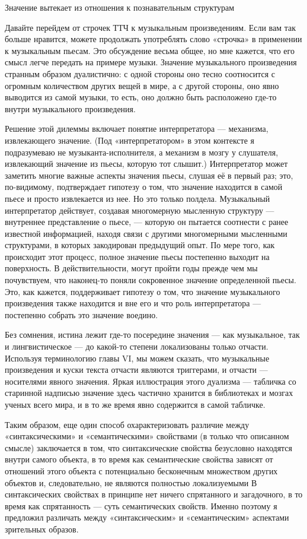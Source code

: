 \documentclass[../main.tex]{subfiles}
\begin{document}
Значение вытекает из отношения к познавательным структурам

Давайте перейдем от строчек ТТЧ к музыкальным произведениям. Если вам так больше нравится, можете продолжать употреблять слово «строчка» в применении к музыкальным пьесам. Это обсуждение весьма общее, но мне кажется, что его смысл легче передать на примере музыки. Значение музыкального произведения странным образом дуалистично: с одной стороны оно тесно соотносится с огромным количеством других вещей в мире, а с другой стороны, оно явно выводится из самой музыки, то есть, оно должно быть расположено где-то внутри музыкального произведения.

Решение этой дилеммы включает понятие интерпретатора --- механизма, извлекающего значение. (Под «интерпретатором» в этом контексте я подразумеваю не музыканта-исполнителя, а механизм в мозгу у слушателя, извлекающий значение из пьесы, которую тот слышит.) Интерпретатор может заметить многие важные аспекты значения пьесы, слушая её в первый раз; это, по-видимому, подтверждает гипотезу о том, что значение находится в самой пьесе и просто извлекается из нее. Но это только полдела. Музыкальный интерпретатор действует, создавая многомерную мысленную структуру --- внутреннее представление о пьесе, --- которую он пытается соотнести с ранее известной информацией, находя связи с другими многомерными мысленными структурами, в которых закодирован предыдущий опыт. По мере того, как происходит этот процесс, полное значение пьесы постепенно выходит на поверхность. В действительности, могут пройти годы прежде чем мы почувствуем, что наконец-то поняли сокровенное значение определенной пьесы. Это, как кажется, поддерживает гипотезу о том, что значение музыкального произведения также находится и вне его и что роль интерпретатора --- постепенно собрать это значение воедино.

Без сомнения, истина лежит где-то посередине значения --- как музыкальное, так и лингвистическое --- до какой-то степени локализованы только отчасти. Используя терминологию главы VI, мы можем сказать, что музыкальные произведения и куски текста отчасти являются триггерами, и отчасти --- носителями явного значения. Яркая иллюстрация этого дуализма --- табличка со старинной надписью значение здесь частично хранится в библиотеках и мозгах ученых всего мира, и в то же время явно содержится в самой табличке.

Таким образом, еще один способ охарактеризовать различие между «синтаксическими» и «семантическими» свойствами (в только что описанном смысле) заключается в том, что синтаксические свойства безусловно находятся внутри самого объекта, в то время как семантические свойства зависят от отношений этого объекта с потенциально бесконечным множеством других объектов и, следовательно, не являются полностью локализуемыми В синтаксических свойствах в принципе нет ничего спрятанного и загадочного, в то время как спрятанность --- суть семантических свойств. Именно поэтому я предложил различать между «синтаксическим» и «семантическим» аспектами зрительных образов.
\end{document}

